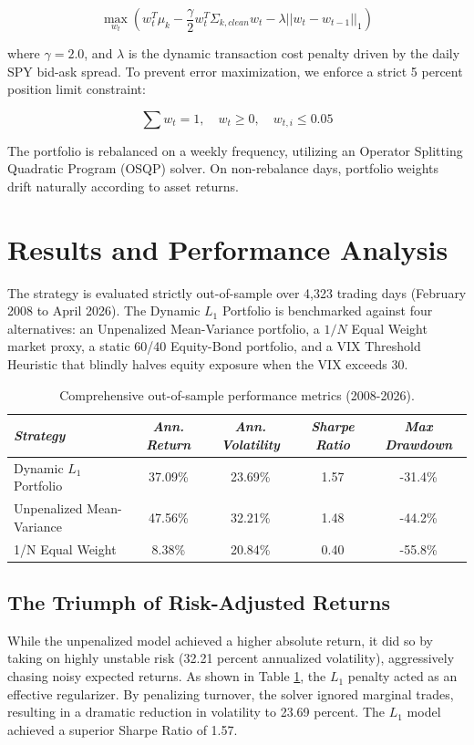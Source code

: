\documentclass[12pt]{article}
\begin{document}
$$\max_{w_t} \left( w_t^T \mu_k - \frac{\gamma}{2} w_t^T \Sigma_{k,clean} w_t - \lambda ||w_t - w_{t-1}||_1 \right)$$

where $\gamma = 2.0$, and $\lambda$ is the dynamic transaction cost penalty driven by the daily SPY bid-ask spread. To prevent error maximization, we enforce a strict 5 percent position limit constraint:

$$\sum w_t = 1, \quad w_t \ge 0, \quad w_{t,i} \le 0.05$$

The portfolio is rebalanced on a weekly frequency, utilizing an Operator Splitting Quadratic Program (OSQP) solver. On non-rebalance days, portfolio weights drift naturally according to asset returns.

\newpage
\section{Results and Performance Analysis}
The strategy is evaluated strictly out-of-sample over 4,323 trading days (February 2008 to April 2026). The Dynamic $L_1$ Portfolio is benchmarked against four alternatives: an Unpenalized Mean-Variance portfolio, a $1/N$ Equal Weight market proxy, a static 60/40 Equity-Bond portfolio, and a VIX Threshold Heuristic that blindly halves equity exposure when the VIX exceeds 30.

\begin{table}[H]
    \centering
    \begin{tabular}{lcccc}
        \toprule
        \textit{Strategy} & \textit{Ann. Return} & \textit{Ann. Volatility} & \textit{Sharpe Ratio} & \textit{Max Drawdown} \\
        \midrule
        Dynamic $L_1$ Portfolio & 37.09\% & 23.69\% & 1.57 & -31.4\% \\
        Unpenalized Mean-Variance & 47.56\% & 32.21\% & 1.48 & -44.2\% \\
        1/N Equal Weight & 8.38\% & 20.84\% & 0.40 & -55.8\% \\
        \bottomrule
    \end{tabular}
    \caption{Comprehensive out-of-sample performance metrics (2008-2026).}
    \label{tab:metrics}
\end{table}

\subsection{The Triumph of Risk-Adjusted Returns}
While the unpenalized model achieved a higher absolute return, it did so by taking on highly unstable risk (32.21 percent annualized volatility), aggressively chasing noisy expected returns. As shown in Table \ref{tab:metrics}, the $L_1$ penalty acted as an effective regularizer. By penalizing turnover, the solver ignored marginal trades, resulting in a dramatic reduction in volatility to 23.69 percent. The $L_1$ model achieved a superior Sharpe Ratio of 1.57.
\end{document}
